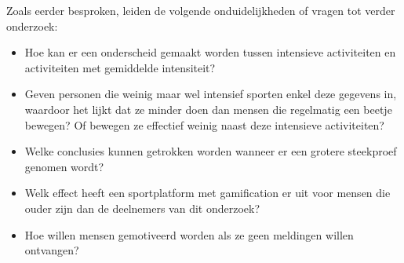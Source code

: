 Zoals eerder besproken, leiden de volgende onduidelijkheden of vragen tot verder onderzoek:

\begin{itemize}
    \item Hoe kan er een onderscheid gemaakt worden tussen intensieve activiteiten en activiteiten met gemiddelde intensiteit?
    \item Geven personen die weinig maar wel intensief sporten enkel deze gegevens in, waardoor het lijkt dat ze minder doen dan mensen die regelmatig een beetje bewegen? Of bewegen ze effectief weinig naast deze intensieve activiteiten?
    \item Welke conclusies kunnen getrokken worden wanneer er een grotere steekproef genomen wordt?
    \item Welk effect heeft een sportplatform met gamification er uit voor mensen die ouder zijn dan de deelnemers van dit onderzoek?
    \item Hoe willen mensen gemotiveerd worden als ze geen meldingen willen ontvangen?
\end{itemize}